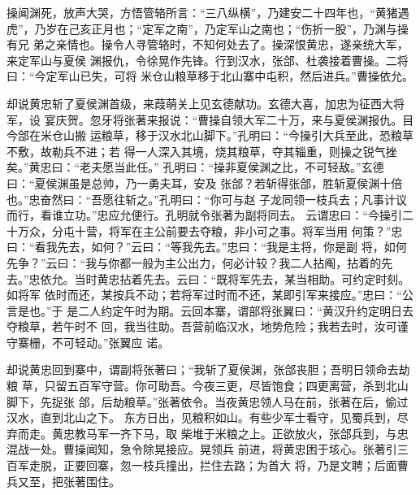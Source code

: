 操闻渊死，放声大哭，方悟管辂所言：“三八纵横”，乃建安二十四年也，“黄猪遇
虎”，乃岁在己亥正月也；“定军之南”，乃定军山之南也；“伤折一股”，乃渊与操有兄
弟之亲情也。操令人寻管辂时，不知何处去了。操深恨黄忠，遂亲统大军，来定军山与夏侯
渊报仇，令徐晃作先锋。行到汉水，张郃、杜袭接着曹操。二将曰：“今定军山已失，可将
米仓山粮草移于北山寨中屯积，然后进兵。”曹操依允。

却说黄忠斩了夏侯渊首级，来葭萌关上见玄德献功。玄德大喜，加忠为征西大将军，设
宴庆贺。忽牙将张著来报说：“曹操自领大军二十万，来与夏侯渊报仇。目今郃在米仓山搬
运粮草，移于汉水北山脚下。”孔明曰：“今操引大兵至此，恐粮草不敷，故勒兵不进；若
得一人深入其境，烧其粮草，夺其辎重，则操之锐气挫矣。”黄忠曰：“老夫愿当此任。”
孔明曰：“操非夏侯渊之比，不可轻敌。”玄德曰：“夏侯渊虽是总帅，乃一勇夫耳，安及
张郃？若斩得张郃，胜斩夏侯渊十倍也。”忠奋然曰：“吾愿往斩之。”孔明曰：“你可与赵
子龙同领一枝兵去；凡事计议而行，看谁立功。”忠应允便行。孔明就令张著为副将同去。
云谓忠曰：“今操引二十万众，分屯十营，将军在主公前要去夺粮，非小可之事。将军当用
何策？”忠曰：“看我先去，如何？”云曰：“等我先去。”忠曰：“我是主将，你是副
将，如何先争？”云曰：“我与你都一般为主公出力，何必计较？我二人拈阄，拈着的先
去。”忠依允。当时黄忠拈着先去。云曰：“既将军先去，某当相助。可约定时刻。如将军
依时而还，某按兵不动；若将军过时而不还，某即引军来接应。”忠曰：“公言是也。”于
是二人约定午时为期。云回本寨，谓部将张翼曰：“黄汉升约定明日去夺粮草，若午时不
回，我当往助。吾营前临汉水，地势危险；我若去时，汝可谨守寨栅，不可轻动。”张翼应
诺。

却说黄忠回到寨中，谓副将张著曰；“我斩了夏侯渊，张郃丧胆；吾明日领命去劫粮
草，只留五百军守营。你可助吾。今夜三更，尽皆饱食；四更离营，杀到北山脚下，先捉张
郃，后劫粮草。”张著依令。当夜黄忠领人马在前，张著在后，偷过汉水，直到北山之下。
东方日出，见粮积如山。有些少军士看守，见蜀兵到，尽弃而走。黄忠教马军一齐下马，取
柴堆于米粮之上。正欲放火，张郃兵到，与忠混战一处。曹操闻知，急令除晃接应。晃领兵
前进，将黄忠困于垓心。张著引三百军走脱，正要回寨，忽一枝兵撞出，拦住去路；为首大
将，乃是文聘；后面曹兵又至，把张著围住。

